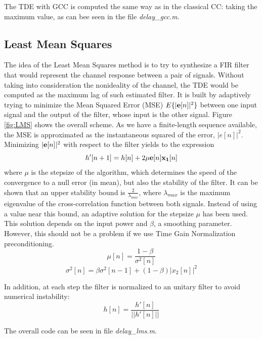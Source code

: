 The TDE with GCC is computed the same way as in the classical CC: taking the maximum value, as can bee seen in the file \emph{delay\_gcc.m}\cite{delaygcc.m}.

\subsection{Least Mean Squares}
The idea of the Least Mean Squares method is to try to synthesize a FIR filter that would represent the channel response between a pair of signals. Without taking into consideration the nonideality of the channel, the TDE would be computed as the maximum lag of such estimated filter. It is built by adaptively trying to minimize the Mean Squared Error (MSE) $E\{|\mathbf{e}[n]|^2\}$ between one input signal and the output of the filter, whose input is the other signal. Figure \ref{fig:LMS} shows the overall scheme. As we have a finite-length sequence available, the MSE is approximated as the instantaneous squared of the error, $|e[n]|^2$. Minimizing $|\mathbf{e}[n]|^2$ with respect to the filter yields to the expression
\begin{dmath}
  h'[n+1] = h[n] + 2 \mu \vect{e}[n] \vect{x_1}[n]
\end{dmath}
where $\mu$ is the stepsize of the algorithm, which determines the speed of the convergence to a null error (in mean), but also the stability of the filter. It can be shown that an upper stability bound is $\frac{2}{\lambda_{max}}$, where $\lambda_{max}$ is the maximum eigenvalue of the cross-correlation function between both signals. Instead of using a value near this bound, an adaptive solution for the stepsize $\mu$ has been used. This solution depends on the input power and $\beta$, a smoothing parameter. However, this should not be a problem if we use Time Gain Normalization preconditioning.
\begin{dmath}
  \mu[n] = \frac{1-\beta}{\sigma^2[n]}
\end{dmath}
\begin{dmath}
  \sigma^2[n] = \beta \sigma^2[n-1] + (1-\beta)|x_2[n]|^2
\end{dmath}

In addition, at each step the filter is normalized to an unitary filter to avoid numerical instability:
\begin{dmath}
  h[n] = \frac{h'[n]}{||h'[n]||}
\end{dmath}

The overall code can be seen in file \emph{delay\_lms.m}\cite{delaylms.m}.

